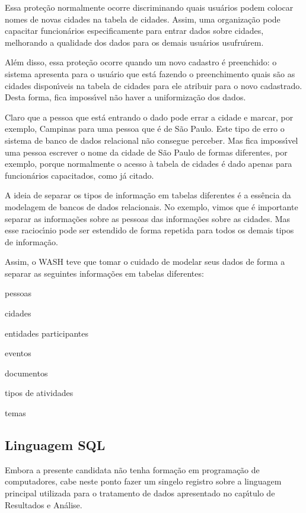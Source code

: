\documentclass[
12pt,		%
openright,	%
twoside,  %
a4paper,			%
chapter=TITLE,		%
english,			%
french,				%
spanish,			%
brazil				%
]{USPSC-classe/USPSC}
\begin{document}
Essa prote\c{c}\~ao normalmente ocorre discriminando quais usu\'arios podem colocar nomes de novas cidades na tabela de cidades. Assim, uma organiza\c{c}\~ao pode capacitar funcion\'arios especificamente para entrar dados sobre cidades, melhorando a qualidade dos dados para os demais usu\'arios usufru\'{\i}rem.


Al\'em disso, essa prote\c{c}\~ao ocorre quando um novo cadastro \'e preenchido: o sistema apresenta para o usu\'ario que est\'a fazendo o preenchimento quais s\~ao as cidades dispon\'{\i}veis na tabela de cidades para ele atribuir para o novo cadastrado. Desta forma, fica imposs\'{\i}vel n\~ao haver a uniformiza\c{c}\~ao dos dados.


Claro que a pessoa que est\'a entrando o dado pode errar a cidade e marcar, por exemplo, Campinas para uma pessoa que \'e de S\~ao Paulo. Este tipo de erro o sistema de banco de dados relacional n\~ao consegue perceber. Mas fica imposs\'{\i}vel uma pessoa escrever o nome da cidade de S\~ao Paulo de formas diferentes, por exemplo, porque normalmente o acesso \`a tabela de cidades \'e dado apenas para funcion\'arios capacitados, como j\'a citado.


A ideia de separar os tipos de informa\c{c}\~ao em tabelas diferentes \'e a ess\^encia da modelagem de bancos de dados relacionais. No exemplo, vimos que \'e importante separar as informa\c{c}\~oes sobre as pessoas das informa\c{c}\~oes sobre as cidades. Mas esse racioc\'{\i}nio pode ser estendido de forma repetida para todos os demais tipos de informa\c{c}\~ao.


Assim, o WASH teve que tomar o cuidado de modelar seus dados de forma a separar as seguintes informa\c{c}\~oes em tabelas diferentes:



\begin{alineas}
\item pessoas
\item cidades
\item entidades participantes
\item eventos
\item documentos
\item tipos de atividades
\item temas
\end{alineas}

\subsection[Linguagem SQL]{Linguagem SQL}\label{Linguagem SQL}
Embora a presente candidata n\~ao tenha forma\c{c}\~ao em programa\c{c}\~ao de computadores, cabe neste ponto fazer um singelo registro sobre a linguagem principal utilizada para o tratamento de dados apresentado no cap\'{\i}tulo de \textquotedbl Resultados e An\'alise\textquotedbl .
\end{document}
